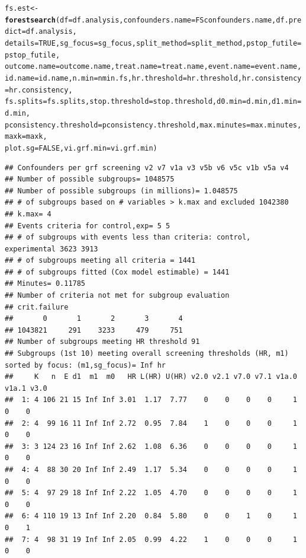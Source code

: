 \documentclass[9pt]{article}\usepackage[]{graphicx}\usepackage[]{xcolor}
\makeatletter
\newcommand{\hlnum}[1]{\textcolor[rgb]{0.686,0.059,0.569}{#1}}%
\newcommand{\hlstd}[1]{\textcolor[rgb]{0.345,0.345,0.345}{#1}}%
\newcommand{\hlkwb}[1]{\textcolor[rgb]{0.69,0.353,0.396}{#1}}%
\newcommand{\hlkwc}[1]{\textcolor[rgb]{0.333,0.667,0.333}{#1}}%
\newcommand{\hlkwd}[1]{\textcolor[rgb]{0.737,0.353,0.396}{\textbf{#1}}}%
\newenvironment{kframe}{%
 \def\at@end@of@kframe{}%
 \ifinner\ifhmode%
  \def\at@end@of@kframe{\end{minipage}}%
  \begin{minipage}{\columnwidth}%
 \fi\fi%
 \def\FrameCommand##1{\hskip\@totalleftmargin \hskip-\fboxsep
 \colorbox{shadecolor}{##1}\hskip-\fboxsep
     \hskip-\linewidth \hskip-\@totalleftmargin \hskip\columnwidth}%
 \MakeFramed {\advance\hsize-\width
   \@totalleftmargin\z@ \linewidth\hsize
   \@setminipage}}%
 {\par\unskip\endMakeFramed%
 \at@end@of@kframe}
\newenvironment{knitrout}{}{} %
\theoremstyle{definition}
\theoremstyle{remark}
\makeatother
\begin{document}
\begin{knitrout}
\begin{kframe}
\begin{alltt}
\hlstd{fs.est} \hlkwb{<-} \hlkwd{forestsearch}\hlstd{(}\hlkwc{df} \hlstd{= df.analysis,} \hlkwc{confounders.name} \hlstd{= FSconfounders.name,} \hlkwc{df.predict} \hlstd{= df.analysis,}
    \hlkwc{details} \hlstd{=} \hlnum{TRUE}\hlstd{,} \hlkwc{sg_focus} \hlstd{= sg_focus,} \hlkwc{split_method} \hlstd{= split_method,} \hlkwc{pstop_futile} \hlstd{= pstop_futile,}
    \hlkwc{outcome.name} \hlstd{= outcome.name,} \hlkwc{treat.name} \hlstd{= treat.name,} \hlkwc{event.name} \hlstd{= event.name,}
    \hlkwc{id.name} \hlstd{= id.name,} \hlkwc{n.min} \hlstd{= nmin.fs,} \hlkwc{hr.threshold} \hlstd{= hr.threshold,} \hlkwc{hr.consistency} \hlstd{= hr.consistency,}
    \hlkwc{fs.splits} \hlstd{= fs.splits,} \hlkwc{stop.threshold} \hlstd{= stop.threshold,} \hlkwc{d0.min} \hlstd{= d.min,} \hlkwc{d1.min} \hlstd{= d.min,}
    \hlkwc{pconsistency.threshold} \hlstd{= pconsistency.threshold,} \hlkwc{max.minutes} \hlstd{= max.minutes,} \hlkwc{maxk} \hlstd{= maxk,}
    \hlkwc{plot.sg} \hlstd{=} \hlnum{FALSE}\hlstd{,} \hlkwc{vi.grf.min} \hlstd{= vi.grf.min)}
\end{alltt}
\begin{verbatim}
## Confounders per grf screening v2 v7 v1a v3 v5b v6 v5c v1b v5a v4 
## Number of possible subgroups= 1048575 
## Number of possible subgroups (in millions)= 1.048575 
## # of subgroups based on # variables > k.max and excluded 1042380 
## k.max= 4 
## Events criteria for control,exp= 5 5 
## # of subgroups with events less than criteria: control, experimental 3623 3913 
## # of subgroups meeting all criteria = 1441 
## # of subgroups fitted (Cox model estimable) = 1441 
## Minutes= 0.11785 
## Number of criteria not met for subgroup evaluation 
## crit.failure
##       0       1       2       3       4 
## 1043821     291    3233     479     751 
## Number of subgroups meeting HR threshold 91 
## Subgroups (1st 10) meeting overall screening thresholds (HR, m1) sorted by focus: (m1,sg_focus)= Inf hr 
##     K   n  E d1  m1  m0   HR L(HR) U(HR) v2.0 v2.1 v7.0 v7.1 v1a.0 v1a.1 v3.0
##  1: 4 106 21 15 Inf Inf 3.01  1.17  7.77    0    0    0    0     1     0    0
##  2: 4  99 16 11 Inf Inf 2.72  0.95  7.84    1    0    0    0     1     0    0
##  3: 3 124 23 16 Inf Inf 2.62  1.08  6.36    0    0    0    0     1     0    0
##  4: 4  88 30 20 Inf Inf 2.49  1.17  5.34    0    0    0    0     1     0    0
##  5: 4  97 29 18 Inf Inf 2.22  1.05  4.70    0    0    0    0     1     0    0
##  6: 4 110 19 13 Inf Inf 2.20  0.84  5.80    0    0    1    0     1     0    1
##  7: 4  98 31 19 Inf Inf 2.05  0.99  4.22    1    0    0    0     1     0    0

\end{verbatim}
\end{kframe}
\end{knitrout}
\end{document}
